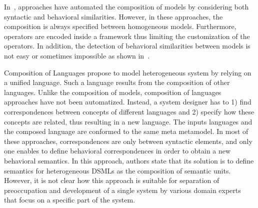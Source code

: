 In~\cite{compostatechartsbib,weavingbib}, approaches have automated the composition of models by considering both syntactic and behavioral similarities. However, in these approaches, the composition is always specified between homogeneous models. Furthermore, operators are encoded inside a framework thus limiting the customization of the operators. In addition, the detection of behavioral similarities between models is not easy or sometimes impossible as shown in~\cite{?}. 

Composition of Languages propose to model heterogeneous system by relying on a unified language. Such a language results from the composition of other languages. Unlike the composition of models, composition of languages approaches have not been automatized. Instead, a system designer has to 1) find correspondences between concepts of different languages and 2) specify how these concepts are related, thus resulting in a new language. The inputs languages and the composed language are conformed to the same meta metamodel. In most of these approaches, correspondences are only between syntactic elements, and only one enables to define behavioral correspondences in order to obtain a new behavioral semantics. In this approach, authors state that its solution is to define semantics for heterogeneous DSMLs as the composition of semantic units. However, it is not clear how this approach is suitable for separation of preoccupation and development of a single system by various domain experts that focus on a specific part of the system. 
